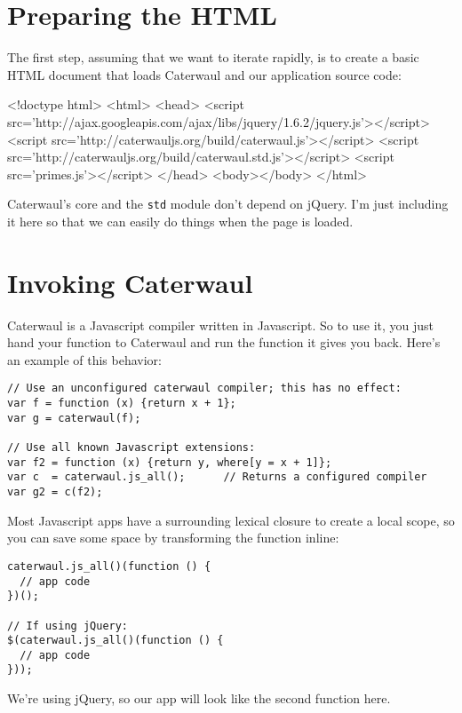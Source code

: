\documentclass{report}
\begin{document}
\section{Preparing the HTML}
    The first step, assuming that we want to iterate rapidly, is to create a basic HTML document that loads Caterwaul and our application source code:

\begin{resourcecode}
<!doctype html>
<html>
  <head>
  <script src='http://ajax.googleapis.com/ajax/libs/jquery/1.6.2/jquery.js'></script>
  <script src='http://caterwauljs.org/build/caterwaul.js'></script>
  <script src='http://caterwauljs.org/build/caterwaul.std.js'></script>
  <script src='primes.js'></script>
  </head>
  <body></body>
</html> \end{resourcecode}

    Caterwaul's core and the {\tt std} module don't depend on jQuery. I'm just including it here so that we can easily do things when the page is loaded.

\section{Invoking Caterwaul}
    Caterwaul is a Javascript compiler written in Javascript. So to use it, you just hand your function to Caterwaul and run the function it gives you back. Here's an example of this behavior:

\begin{verbatim}
// Use an unconfigured caterwaul compiler; this has no effect:
var f = function (x) {return x + 1};
var g = caterwaul(f);

// Use all known Javascript extensions:
var f2 = function (x) {return y, where[y = x + 1]};
var c  = caterwaul.js_all();      // Returns a configured compiler
var g2 = c(f2);
\end{verbatim}

    Most Javascript apps have a surrounding lexical closure to create a local scope, so you can save some space by transforming the function inline:

\begin{verbatim}
caterwaul.js_all()(function () {
  // app code
})();

// If using jQuery:
$(caterwaul.js_all()(function () {
  // app code
}));
\end{verbatim}

    We're using jQuery, so our app will look like the second function here.
\end{document}
